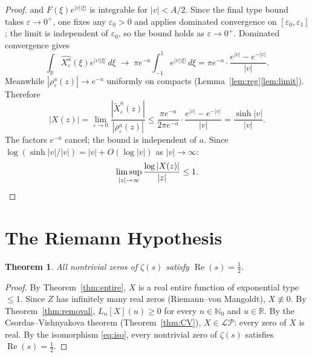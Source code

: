 \documentclass[12pt]{amsart}
\newtheorem{theorem}{Theorem}
\theoremstyle{remark}
\begin{document}
\begin{proof}
and $F(\xi)e^{|v||\xi|}$ is integrable for $|v|<A/2$.  Since the
final type bound takes $\varepsilon\to 0^+$, one fixes any
$\varepsilon_0>0$ and applies dominated convergence on
$[\varepsilon_0,\varepsilon_1]$; the limit is independent of
$\varepsilon_0$, so the bound holds as $\varepsilon\to 0^+$.
Dominated convergence gives
\[
  \int_\mathbb{R}\widehat{X_\varepsilon^a}(\xi)e^{|v||\xi|}\,d\xi
  \;\longrightarrow\;
  \pi e^{-a}\int_{-1}^{1}e^{|v||\xi|}\,d\xi
  =\pi e^{-a}\cdot\frac{e^{|v|}-e^{-|v|}}{|v|}.
\]
Meanwhile $|\rho_\varepsilon^a(z)|\to e^{-a}$ uniformly on compacts
(Lemma~\ref{lem:reg}\ref{lem:limit}).  Therefore
\[
  |X(z)|
  =\lim_{\varepsilon\to 0}
   \frac{|\tilde X_\varepsilon^a(z)|}{|\rho_\varepsilon^a(z)|}
  \leq\frac{\pi e^{-a}}{2\pi e^{-a}}
     \cdot\frac{e^{|v|}-e^{-|v|}}{|v|}
  =\frac{\sinh|v|}{|v|}.
\]
The factors $e^{-a}$ cancel; the bound is independent of $a$.
Since $\log(\sinh|v|/|v|)=|v|+O(\log|v|)$ as $|v|\to\infty$:
\[
  \limsup_{|z|\to\infty}\frac{\log|X(z)|}{|z|}\leq 1. \qedhere
\]
\end{proof}

\section{The Riemann Hypothesis}

\begin{theorem}
All nontrivial zeros of $\zeta(s)$ satisfy $\operatorname{Re}(s)=\tfrac12$.
\end{theorem}

\begin{proof}
By Theorem~\ref{thm:entire}, $X$ is a real entire function of
exponential type $\leq 1$.  Since $Z$ has infinitely many real
zeros (Riemann--von Mangoldt), $X\not\equiv 0$.  By
Theorem~\ref{thm:removal}, $L_n[X](u)\geq 0$ for every
$n\in\mathbb{N}_0$ and $u\in\mathbb{R}$.  By the Csordas--Vishnyakova
theorem (Theorem~\ref{thm:CV}), $X\in\mathcal{LP}$: every zero
of $X$ is real.  By the isomorphism \eqref{eq:iso},
every nontrivial zero of $\zeta(s)$ satisfies
$\operatorname{Re}(s)=\tfrac12$.
\end{proof}
\end{document}
